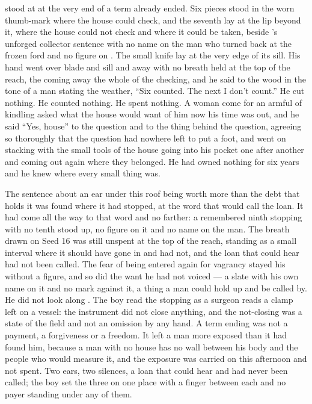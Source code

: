  stood at  at the very end of a term already ended. Six pieces stood in the worn thumb-mark where the house could check, and the seventh lay at the lip beyond it, where the house could not check and where it could be taken, beside 's unforged collector sentence with no name on the man who turned back at the frozen ford and no figure on . The small knife lay at the very edge of its sill. His hand went over blade and sill and away with no breath held at the top of the reach, the coming away the whole of the checking, and he said to the wood in the tone of a man stating the weather, “Six counted. The next I don't count.” He cut nothing. He counted nothing. He spent nothing. A woman come for an armful of kindling asked what the house would want of him now his time was out, and he said “Yes, house” to the question and to the thing behind the question, agreeing so thoroughly that the question had nowhere left to put a foot, and went on stacking with the small tools of the house going into his pocket one after another and coming out again where they belonged. He had owned nothing for six years and he knew where every small thing was.

The sentence about an ear under this roof being worth more than the debt that holds it was found where it had stopped, at the word that would call the loan. It had come all the way to that word and no farther: a remembered ninth stopping with no tenth stood up, no figure on it and no name on the man. The breath drawn on Seed 16 was still unspent at the top of the reach, standing as a small interval where it should have gone in and had not, and the loan that could hear had not been called. The fear of being entered again for vagrancy stayed his without a figure, and so did the want he had not voiced — a slate with his own name on it and no mark against it, a thing a man could hold up and be called by. He did not look along . The boy read the stopping as a surgeon reads a clamp left on a vessel: the instrument did not close anything, and the not-closing was a state of the field and not an omission by any hand. A term ending was not a payment, a forgiveness or a freedom. It left a man more exposed than it had found him, because a man with no house has no wall between his body and the people who would measure it, and the exposure was carried on this afternoon and not spent. Two ears, two silences, a loan that could hear and had never been called; the boy set the three on one place with a finger between each and no payer standing under any of them.

